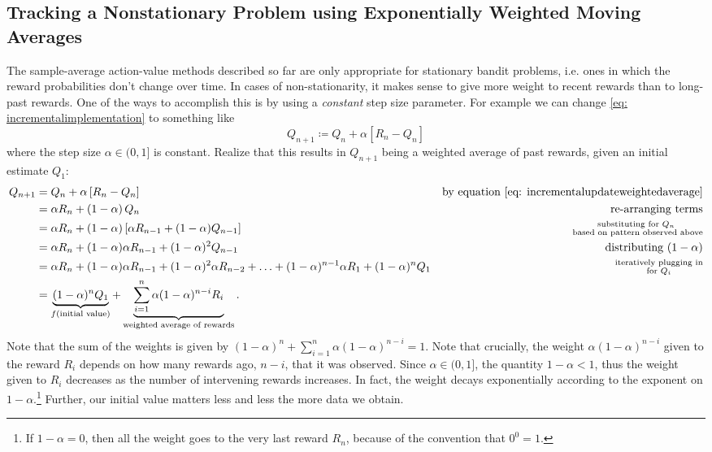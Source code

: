 \documentclass[12pt]{article}
\begin{document}
\subsection{Tracking a Nonstationary Problem using Exponentially Weighted Moving Averages} The sample-average action-value methods described so far are only appropriate for stationary bandit problems, i.e. ones in which the reward probabilities don't change over time. In cases of non-stationarity, it makes sense to give more weight to recent rewards than to long-past rewards. One of the ways to accomplish this is by using a \emph{constant} step size parameter. For example we can change \ref{eq:   incrementalimplementation} to something like
\begin{equation}
  \label{eq: incrementalupdateweightedaverage}
  Q_{n+1} \coloneqq Q_n + \alpha \left[ R_n - Q_n \right]
\end{equation}
where the step size $\alpha \in (0, 1]$ is constant. Realize that this results in $Q_{n+1}$ being a weighted average of past rewards, given an initial estimate $Q_1$:
\begin{align}
  Q_{n+1} &= Q_n + \alpha \left[R_n - Q_n \right] &\textrm{by equation \ref{eq: incrementalupdateweightedaverage}}\nonumber \\
          &= \alpha R_n + \left(1-\alpha\right) Q_n &\textrm{re-arranging terms} \nonumber \\
          &= \alpha R_n + \left(1-\alpha\right) \left[\alpha R_{n-1} +             (1-\alpha)Q_{n-1}\right] &\substack{\textrm{substituting for } Q_n \\ \textrm{ based on pattern observed above}} \nonumber \\
          &= \alpha R_n + (1-\alpha)\alpha R_{n-1} + (1-\alpha)^2 Q_{n-1} &\textrm{distributing } (1-\alpha) \nonumber \\
          &= \alpha R_n + (1-\alpha)\alpha R_{n-1} + (1-\alpha)^2 \alpha R_{n-2}             + \ldots + (1-\alpha)^{n-1} \alpha R_1 + (1-\alpha)^n Q_1 &\substack{\textrm{iteratively plugging in} \\ \textrm{for } Q_i} \nonumber  \\
          &= \underbrace{(1-\alpha)^n Q_1}_{f(\textrm{initial value})} + \underbrace{\sum_{i=1}^{n} \alpha (1-\alpha)^{n-i} R_i}_{\textrm{weighted average of rewards}}. \label{eq: expoweightedaveragenonstationaryproblem}
\end{align}
Note that the sum of the weights is given by $(1-\alpha)^n + \sum_{i=1}^n \alpha (1-\alpha)^{n-i} = 1$. Note that crucially, the weight $\alpha(1-\alpha)^{n-i}$ given to the reward $R_i$ depends on how many rewards ago, $n-i$, that it was observed. Since $\alpha \in (0,1]$, the quantity $1-\alpha < 1$, thus the weight given to $R_i$ decreases as the number of intervening rewards increases. In fact, the weight decays exponentially according to the exponent on $1-\alpha$.\footnote{If $1-\alpha=0$, then all the weight goes to the very last   reward $R_n$, because of the convention that $0^0=1$.} Further, our initial value matters less and less the more data we obtain.
\end{document}
